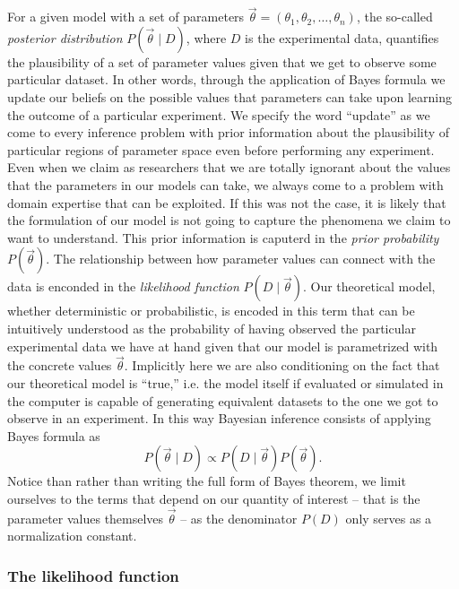 For a given model with a set of parameters $\vec{\theta} = (\theta_1, \theta_2,
\ldots, \theta_n)$, the so-called \textit{posterior distribution} 
$P(\vec{\theta} \mid D)$, where $D$ is the experimental data, quantifies the
plausibility of a set of parameter values given that we get to observe some
particular dataset. In other words, through the application of Bayes formula we
update our beliefs on the possible values that parameters can take upon learning
the outcome of a particular experiment. We specify the word ``update'' as we
come to every inference problem with prior information about the plausibility of
particular regions of parameter space even before performing any experiment.
Even when we claim as researchers that we are totally ignorant about the values
that the parameters in our models can take, we always come to a problem with
domain expertise that can be exploited. If this was not the case, it is likely
that the formulation of our model is not going to capture the phenomena we claim
to want to understand. This prior information is caputerd in the \textit{prior
probability} $P(\vec{\theta})$. The relationship between how parameter values
can connect with the data is enconded in the \textit{likelihood function} $P(D
\mid \vec{\theta})$. Our theoretical model, whether deterministic or
probabilistic, is encoded in this term that can be intuitively understood as the
probability of having observed the particular experimental data we have at hand
given that our model is parametrized with the concrete values $\vec{\theta}$. 
Implicitly here we are also conditioning on the fact that our theoretical model
is ``true,'' i.e. the model itself if evaluated or simulated in the computer is
capable of generating equivalent datasets to the one we got to observe in an 
experiment. In this way Bayesian inference consists of applying Bayes formula 
as 
\begin{equation}
P(\vec{\theta} \mid D) \propto P(D \mid \vec{\theta}) P(\vec{\theta}).
\end{equation}
Notice than rather than writing the full form of Bayes theorem, we limit 
ourselves to the terms that depend on our quantity of interest -- that is the 
parameter values themselves $\vec{\theta}$ -- as the denominator $P(D)$ only
serves as a normalization constant.

\subsubsection{The likelihood function}

